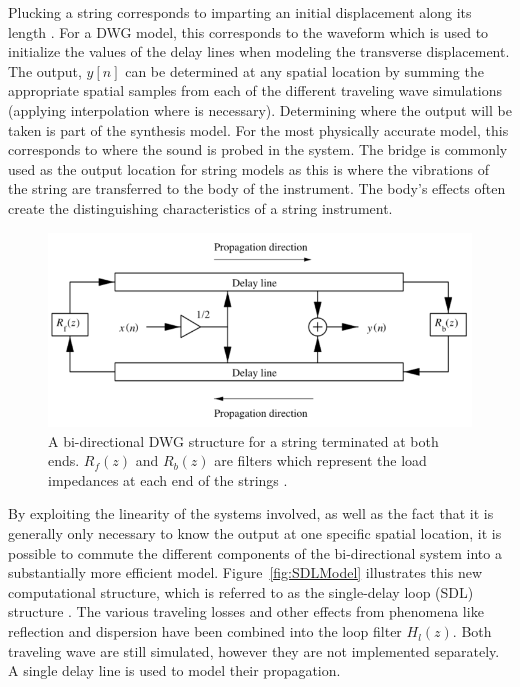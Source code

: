 \documentclass[main.tex]{subfiles}
\begin{document}
Plucking a string corresponds to imparting an initial displacement along its length . For a DWG model, this corresponds to the waveform which is used to initialize the values of the delay lines when modeling the transverse displacement. The output, $y[n]$ can be determined at any spatial location by summing the appropriate spatial samples from each of the different traveling wave simulations (applying interpolation where is necessary). Determining where the output will be taken is part of the synthesis model. For the most physically accurate model, this corresponds to where the sound is probed in the system. The bridge is commonly used as the output location for string models as this is where the vibrations of the string are transferred to the body of the instrument. The body's effects often create the distinguishing characteristics of a string instrument.

\begin{figure}[h]
    \centering
    \includegraphics[scale=.85]{./images/diagrams/BiDirectionalDWG1.png}
    \caption{A bi-directional DWG structure for a string terminated at both ends. $R_f(z)$ and $R_b(z)$ are filters which represent the load impedances at each end of the strings .}
    \label{fig:BiDirectionDWG}
\end{figure}

By exploiting the linearity of the systems involved, as well as the fact that it is generally only necessary to know the output at one specific spatial location, it is possible to commute the different components of the bi-directional system into a substantially more efficient model. Figure~\ref{fig:SDLModel} illustrates this new computational structure, which is referred to as the single-delay loop (SDL) structure . The various traveling losses and other effects from phenomena like reflection and dispersion have been combined into the loop filter $H_l(z)$. Both traveling wave are still simulated, however they are not implemented separately. A single delay line is used to model their propagation.
\end{document}
